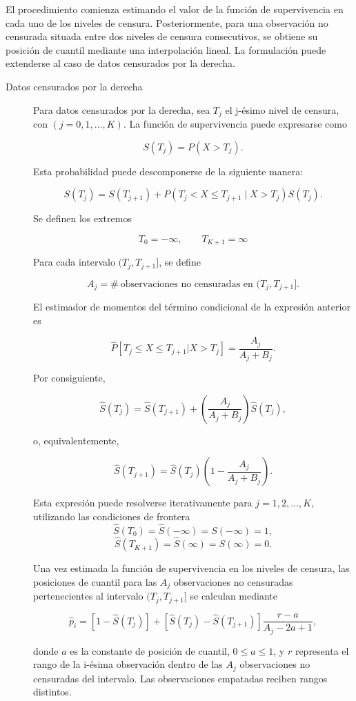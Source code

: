 \begin{enumerate}
El procedimiento comienza estimando el valor de la función de supervivencia en cada uno de los niveles de censura. Posteriormente, para una observación no censurada situada entre dos niveles de censura consecutivos, se obtiene su posición de cuantil mediante una interpolación lineal. La formulación puede extenderse al caso de datos censurados por la derecha.

\begin{description}
    \item[Datos censurados por la derecha] 

Para datos censurados por la derecha, sea $T_j$ el j-ésimo nivel de censura, con $(j=0,1,\ldots,K)$. La función de supervivencia puede expresarse como

$$S(T_j)=P(X>T_j).$$

Esta probabilidad puede descomponerse de la siguiente manera:

$$S(T_j)=S(T_{j+1})+P(T_j<X\leq T_{j+1}\mid X>T_j)S(T_j).$$

Se definen los extremos

$$T_0=-\infty,
\qquad
T_{K+1}=\infty$$

Para cada intervalo $(T_j,T_{j+1}]$, se define

$$A_j=\#~{\text{observaciones no censuradas en }(T_j,T_{j+1}]}.$$

El estimador de momentos del término condicional de la expresión anterior es

$$\widehat{P}[T_j \leq X \leq T_{j+1}| X > T_j] = \frac{A_j}{A_j+B_j}.$$

Por consiguiente,

$$\hat{S}(T_j)=\hat{S}(T_{j+1}) + \left( \frac{A_j}{A_j+B_j}\right)\hat{S}(T_j),$$

o, equivalentemente,

$$\hat{S}(T_{j+1})=\hat{S}(T_j)
\left(
1-\frac{A_j}{A_j+B_j}
\right).$$

Esta expresión puede resolverse iterativamente para $j=1,2,\ldots,K$, utilizando las condiciones de frontera $$\hat{S}(T_0)=\hat{S}(-\infty)=S(-\infty)=1,$$ $$\hat{S}(T_{K+1})=\hat{S}(\infty)=S(\infty)=0.$$

Una vez estimada la función de supervivencia en los niveles de censura, las posiciones de cuantil para las $A_j$ observaciones no censuradas pertenecientes al intervalo $(T_j,T_{j+1}]$ se calculan mediante

$$\hat{p}_i=[1-\hat{S}(T_j)] + [\hat{S}(T_j)-\hat{S}(T_{j+1})] \frac{r-a}{A_j-2a+1},$$

donde $a$ es la constante de posición de cuantil, $0\leq a\leq 1$, y $r$ representa el rango de la i-ésima observación dentro de las $A_j$ observaciones no censuradas del intervalo. Las observaciones empatadas reciben rangos distintos.


\end{description}
\end{enumerate}
